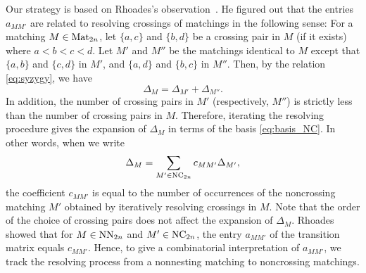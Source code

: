 Our strategy is based on Rhoades's observation~\cite{Rho19}.
He figured out that the entries \( a_{MM'} \) are related to resolving crossings
of matchings in the following sense:
For a matching \( M\in\operatorname{Mat}_{2n} \), let \( \{ a,c \} \) and \( \{ b,d \} \) be
a crossing pair in \( M \) (if it exists) where \( a<b<c<d \).
Let \( M' \) and \( M'' \) be the matchings identical to \( M \) except that
\( \{ a,b \} \) and \( \{ c,d \} \) in \( M' \), and
\( \{ a,d \} \) and \( \{ b,c \} \) in \( M'' \).
Then, by the relation \eqref{eq:syzygy}, we have
\begin{equation}\label{Eq: web relation}
  \Delta_M = \Delta_{M'} + \Delta_{M''}.
\end{equation}
In addition, the number of crossing pairs in \( M' \) (respectively, \( M'' \)) is
strictly less than the number of crossing pairs in \( M \).
Therefore, iterating the resolving procedure gives the expansion of \( \Delta_M \)
in terms of the basis \eqref{eq:basis_NC}.
In other words, when we write 
\begin{equation} \label{eq: web expansion}
  \Delta_M = \sum_{M'\in\operatorname{NC}_{2n}}c_{MM'} \Delta_{M'},
\end{equation}
the coefficient \( c_{MM'} \) is equal to
the number of occurrences of the noncrossing matching \( M' \)
obtained by iteratively resolving crossings in \( M \).
Note that the order of the choice of crossing pairs does not affect the expansion of \( \Delta_M \).
Rhoades showed that for \( M\in\operatorname{NN}_{2n} \) and \( M'\in\operatorname{NC}_{2n} \),
the entry \( a_{MM'} \) of the transition matrix equals \( c_{MM'} \).
Hence, to give a combinatorial interpretation of \( a_{MM'} \), we track
the resolving process from a nonnesting matching to noncrossing matchings.

